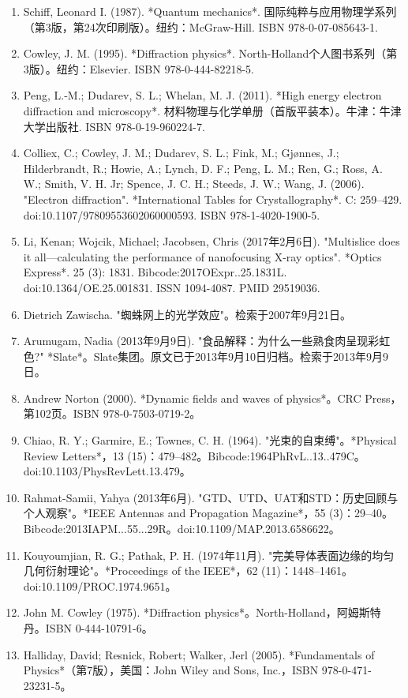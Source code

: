 \begin{enumerate}
\item Schiff, Leonard I. (1987). *Quantum mechanics*. 国际纯粹与应用物理学系列（第3版，第24次印刷版）。纽约：McGraw-Hill. ISBN 978-0-07-085643-1.
\item Cowley, J. M. (1995). *Diffraction physics*. North-Holland个人图书系列（第3版）。纽约：Elsevier. ISBN 978-0-444-82218-5.
\item Peng, L.-M.; Dudarev, S. L.; Whelan, M. J. (2011). *High energy electron diffraction and microscopy*. 材料物理与化学单册（首版平装本）。牛津：牛津大学出版社. ISBN 978-0-19-960224-7.
\item Colliex, C.; Cowley, J. M.; Dudarev, S. L.; Fink, M.; Gjønnes, J.; Hilderbrandt, R.; Howie, A.; Lynch, D. F.; Peng, L. M.; Ren, G.; Ross, A. W.; Smith, V. H. Jr; Spence, J. C. H.; Steeds, J. W.; Wang, J. (2006). "Electron diffraction". *International Tables for Crystallography*. C: 259–429. doi:10.1107/97809553602060000593. ISBN 978-1-4020-1900-5.
\item Li, Kenan; Wojcik, Michael; Jacobsen, Chris (2017年2月6日). "Multislice does it all—calculating the performance of nanofocusing X-ray optics". *Optics Express*. 25 (3): 1831. Bibcode:2017OExpr..25.1831L. doi:10.1364/OE.25.001831. ISSN 1094-4087. PMID 29519036.
\item Dietrich Zawischa. "蜘蛛网上的光学效应"。检索于2007年9月21日。
\item Arumugam, Nadia (2013年9月9日). "食品解释：为什么一些熟食肉呈现彩虹色?" *Slate*。Slate集团。原文已于2013年9月10日归档。检索于2013年9月9日。
\item Andrew Norton (2000). *Dynamic fields and waves of physics*。CRC Press，第102页。ISBN 978-0-7503-0719-2。
\item Chiao, R. Y.; Garmire, E.; Townes, C. H. (1964). "光束的自束缚"。*Physical Review Letters*，13 (15)：479–482。Bibcode:1964PhRvL..13..479C。doi:10.1103/PhysRevLett.13.479。
\item Rahmat-Samii, Yahya (2013年6月). "GTD、UTD、UAT和STD：历史回顾与个人观察"。*IEEE Antennas and Propagation Magazine*，55 (3)：29–40。Bibcode:2013IAPM...55...29R。doi:10.1109/MAP.2013.6586622。
\item Kouyoumjian, R. G.; Pathak, P. H. (1974年11月). "完美导体表面边缘的均匀几何衍射理论"。*Proceedings of the IEEE*，62 (11)：1448–1461。doi:10.1109/PROC.1974.9651。
\item John M. Cowley (1975). *Diffraction physics*。North-Holland，阿姆斯特丹。ISBN 0-444-10791-6。
\item Halliday, David; Resnick, Robert; Walker, Jerl (2005). *Fundamentals of Physics*（第7版），美国：John Wiley and Sons, Inc.，ISBN 978-0-471-23231-5。

\end{enumerate}
